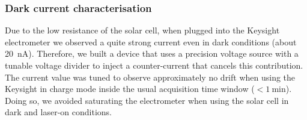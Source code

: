 
  

\subsubsection{Dark current characterisation}

Due to the low resistance of the solar cell, when plugged into the Keysight electrometer we observed a quite strong current even in dark conditions (about \SI{20}{\nano\ampere}). Therefore, we built a device that uses a precision voltage source with a tunable voltage divider to inject a counter-current that cancels this contribution. The current value was tuned to observe approximately no drift when using the Keysight in charge mode inside the usual acquisition time window ($< \SI{1}{\minute}$). Doing so, we avoided saturating the electrometer when using the solar cell in dark and laser-on conditions. 

